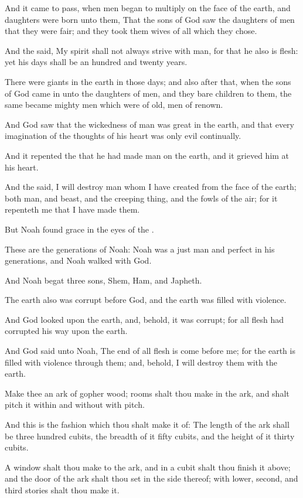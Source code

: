 \verse And it came to pass, when men began to multiply on the face of the earth, and daughters were born unto them, \verse That the sons of God saw the daughters of men that they were fair; and they took them wives of all which they chose.

\verse And the \LORD said, My spirit shall not always strive with man, for that he also is flesh: yet his days shall be an hundred and twenty years.

\verse There were giants in the earth in those days; and also after that, when the sons of God came in unto the daughters of men, and they bare children to them, the same became mighty men which were of old, men of renown.

\verse And God saw that the wickedness of man was great in the earth, and that every imagination of the thoughts of his heart was only evil continually.

\verse And it repented the \LORD that he had made man on the earth, and it grieved him at his heart.

\verse And the \LORD said, I will destroy man whom I have created from the face of the earth; both man, and beast, and the creeping thing, and the fowls of the air; for it repenteth me that I have made them.

\verse But Noah found grace in the eyes of the \LORD.

\verse These are the generations of Noah: Noah was a just man and perfect in his generations, and Noah walked with God.

\verse And Noah begat three sons, Shem, Ham, and Japheth.

\verse The earth also was corrupt before God, and the earth was filled with violence.

\verse And God looked upon the earth, and, behold, it was corrupt; for all flesh had corrupted his way upon the earth.

\verse And God said unto Noah, The end of all flesh is come before me; for the earth is filled with violence through them; and, behold, I will destroy them with the earth.

\verse Make thee an ark of gopher wood; rooms shalt thou make in the ark, and shalt pitch it within and without with pitch.

\verse And this is the fashion which thou shalt make it of: The length of the ark shall be three hundred cubits, the breadth of it fifty cubits, and the height of it thirty cubits.

\verse A window shalt thou make to the ark, and in a cubit shalt thou finish it above; and the door of the ark shalt thou set in the side thereof; with lower, second, and third stories shalt thou make it.

